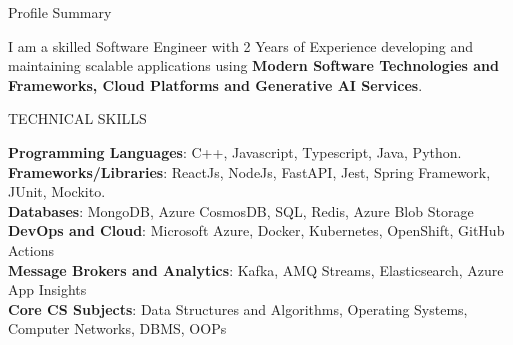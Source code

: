 \documentclass{resume} %
\begin{document}

\begin{rSection}{Profile Summary}

{\normalfont I am a skilled Software Engineer with 2 Years of Experience developing and maintaining scalable applications using \textbf{Modern Software  Technologies and Frameworks, Cloud Platforms and Generative AI Services}.}

\end{rSection}





\begin{rSection}{TECHNICAL SKILLS}

\textbf{Programming Languages}: {\normalfont C++, Javascript, Typescript, Java, Python.}
\\
\textbf{Frameworks/Libraries}: {\normalfont ReactJs, NodeJs, FastAPI, Jest, Spring Framework, JUnit, Mockito.}
 \\
 \textbf{Databases}: {\normalfont MongoDB, Azure CosmosDB, SQL, Redis, Azure Blob Storage}
 \\
 \textbf{DevOps and Cloud}: {\normalfont Microsoft Azure, Docker, Kubernetes, OpenShift, GitHub Actions}
 \\
 \textbf{Message Brokers and Analytics}: {\normalfont Kafka, AMQ Streams, Elasticsearch, Azure App Insights}  
\\ \textbf{Core CS Subjects}: {\normalfont Data Structures and Algorithms, Operating Systems, Computer Networks, DBMS, OOPs}
\end{rSection}




\end{document}
